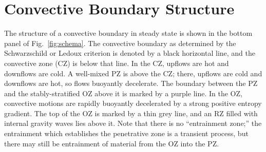 \section{Convective Boundary Structure}
\label{sec:structure}
The structure of a convective boundary in steady state is shown in the bottom panel of Fig.~\ref{fig:schema}.
The convective boundary as determined by the Schwarzschild or Ledoux criterion is denoted by a black horizontal line, and the convective zone (CZ) is below that line.
In the CZ, upflows are hot and downflows are cold.
A well-mixed PZ is above the CZ; there, upflows are cold and downflows are hot, so flows buoyantly decelerate.
The boundary between the PZ and the stably-stratified OZ above it is marked by a purple line.
In the OZ, convective motions are rapidly buoyantly decelerated by a strong positive entropy gradient.
The top of the OZ is marked by a thin grey line, and an RZ filled with internal gravity waves lies above it.
Note that there is no ``entrainment zone;'' the entrainment which establishes the penetrative zone is a transient process, but there may still be entrainment of material from the OZ into the PZ.